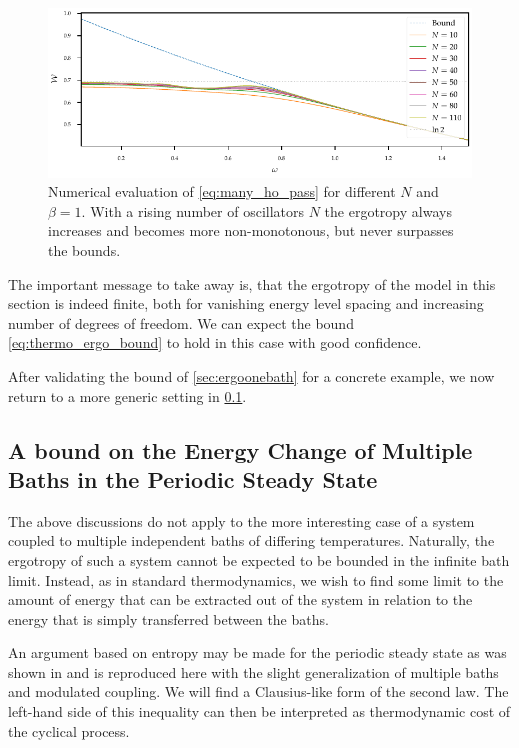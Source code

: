\begin{figure}[htp]
  \includegraphics{figs/ergo_calc/ergo_nonmonotonic}
  \caption{\label{fig:numeric_n_ho_ergo_nonmon} Numerical evaluation
    of \cref{eq:many_ho_pass} for different \(N\) and \(β=1\). With a
    rising number of oscillators \(N\) the ergotropy always increases
    and becomes more non-monotonous, but never surpasses the bounds.}
\end{figure}

The important message to take away is, that the ergotropy of the model
in this section is indeed finite, both for vanishing energy level
spacing and increasing number of degrees of freedom. We can expect the
bound \cref{eq:thermo_ergo_bound} to hold in this case with good
confidence.

After validating the bound of \cref{sec:ergoonebath} for a concrete
example, we now return to a more generic setting in
\cref{sec:operational_thermo}.

\subsection{A bound on the Energy Change of Multiple Baths in the
  Periodic Steady State}
\label{sec:operational_thermo}
The above discussions do not apply to the more interesting case of a
system coupled to multiple independent baths of differing
temperatures. Naturally, the ergotropy of such a system cannot be
expected to be bounded in the infinite bath limit. Instead, as in
standard thermodynamics, we wish to find some limit to the amount of
energy that can be extracted out of the system in relation to the
energy that is simply transferred between the baths.

An argument based on entropy may be made for the periodic steady state
as was shown in  and is reproduced here with the
slight generalization of multiple baths and modulated coupling. We
will find a Clausius-like form of the second law. The left-hand side
of this inequality can then be interpreted as thermodynamic cost of
the cyclical process.

